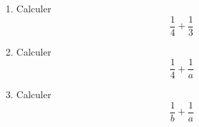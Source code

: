\begin{MentalActivity}
\begin{mental}
    \begin{enumerate}
        \item
            Calculer
            \begin{equation*}
                \frac{1}{ 4 }+\frac{1}{ 3 }
            \end{equation*}
        \item
            Calculer 
            \begin{equation*}
                \frac{1}{ 4 }+\frac{1}{ a }
            \end{equation*}
        \item
            Calculer
            \begin{equation*}
                \frac{1}{ b }+\frac{1}{ a }
            \end{equation*}
    \end{enumerate}
\end{mental}

\end{MentalActivity}


